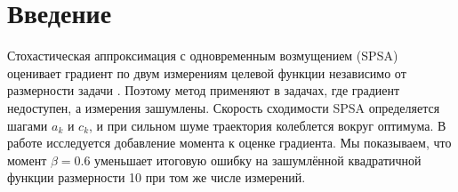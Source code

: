 \section{Введение}\label{sec:intro}
Стохастическая аппроксимация с одновременным возмущением (SPSA) оценивает градиент по двум измерениям
целевой функции независимо от размерности задачи \cite{spall1992}.
Поэтому метод применяют в задачах, где градиент недоступен, а измерения зашумлены.
Скорость сходимости SPSA определяется шагами $a_k$ и $c_k$, и при сильном шуме траектория
колеблется вокруг оптимума.
В работе исследуется добавление момента к оценке градиента.
Мы показываем, что момент $\beta = 0.6$ уменьшает итоговую ошибку на зашумлённой квадратичной функции
размерности 10 при том же числе измерений.
